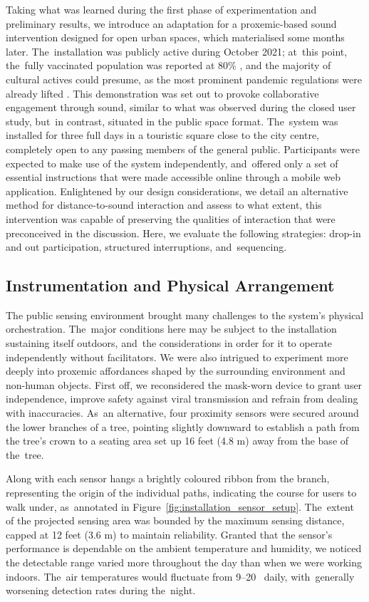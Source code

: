 Taking what was learned during the first phase of experimentation and preliminary results, we introduce an adaptation for a proxemic-based sound intervention designed for open urban spaces, which materialised some months later. The~installation was publicly active during October 2021; at~this point, the~fully vaccinated population was reported at 80\% \cite{ritchie_coronavirus_2020}, and the majority of cultural actives could presume, as the most prominent pandemic regulations were already lifted \cite{direcao-geral_da_saude_dgs_covid-19_2022}. This demonstration was set out to provoke collaborative engagement through sound, similar to what was observed during the closed user study, but~in contrast, situated in the public space format. The~system was installed for three full days in a touristic square close to the city centre, completely open to any passing members of the general public. Participants were expected to make use of the system independently, and~offered only a set of essential instructions that were made accessible online through a mobile web application. Enlightened by our design considerations, we detail an alternative method for distance-to-sound interaction and assess to what extent, this intervention was capable of preserving the qualities of interaction that were preconceived in the discussion. Here, we evaluate the following strategies: drop-in and out participation, structured interruptions, and~sequencing.

\subsection*{Instrumentation and Physical Arrangement}

The public sensing environment brought many challenges to the system's physical orchestration. The~major conditions here may be subject to the installation sustaining itself outdoors, and~the considerations in order for it to operate independently without facilitators. We were also intrigued to experiment more deeply into proxemic affordances shaped by the surrounding environment and non-human objects. First off, we reconsidered the mask-worn device to grant user independence, improve safety against viral transmission and refrain from dealing with inaccuracies. As~an alternative, four proximity sensors were secured around the lower branches of a tree, pointing slightly downward to establish a path from the tree's crown to a seating area set up 16 feet (4.8 m) away from the base of the~tree.

Along with each sensor hangs a brightly coloured ribbon from the branch, representing the origin of the individual paths, indicating the course for users to walk under, as~annotated in Figure~\ref{fig:installation_sensor_setup}. The~extent of the projected sensing area was bounded by the maximum sensing distance, capped at 12 feet (3.6 m) to maintain reliability. Granted that the sensor's performance is dependable on the ambient temperature and humidity, we noticed the detectable range varied more throughout the day than when we were working indoors. The~air temperatures would fluctuate from 9--20 \celsius~daily, with~generally worsening detection rates during the~night.

